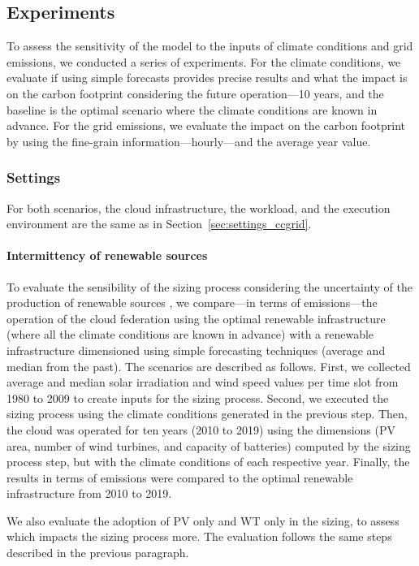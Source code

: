\subsection{Experiments}

To assess the sensitivity of the model to the inputs of climate conditions and grid emissions, we conducted a series of experiments. For the climate conditions, we evaluate if using simple forecasts provides precise results and what the impact is on the carbon footprint considering the future operation---10 years, and the baseline is the optimal scenario where the climate conditions are known in advance. For the grid emissions, we evaluate the impact on the carbon footprint by using the fine-grain information---hourly---and the average year value.


\subsubsection{Settings}


For both scenarios, the cloud infrastructure, the workload, and the execution environment are the same as in Section~\ref{sec:settings_ccgrid}.

\paragraph{Intermittency of renewable sources}

To evaluate the sensibility of the sizing process considering the uncertainty of the production of renewable sources , we compare---in terms of  emissions---the operation of the cloud federation using the optimal renewable infrastructure (where all the climate conditions are known in advance) with a renewable infrastructure dimensioned using simple forecasting techniques (average and median from the past). The scenarios are described as follows. First, we collected average and median solar irradiation and wind speed values per time slot from 1980 to 2009 to create inputs for the sizing process. Second, we executed the sizing process using the climate conditions generated in the previous step. Then, the cloud was operated for ten years (2010 to 2019) using the dimensions (PV area, number of wind turbines, and capacity of batteries) computed by the sizing process step, but with the climate conditions of each respective year. Finally, the results in terms of  emissions were compared to the optimal renewable infrastructure from 2010 to 2019.

We also evaluate the adoption of PV only and WT only in the sizing, to assess which impacts the sizing process more. The evaluation follows the same steps described in the previous paragraph.

